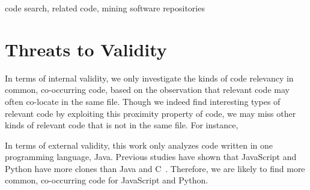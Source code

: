 \documentclass[conference]{IEEEtran}
\begin{document}
\begin{abstract}

\end{abstract}

\begin{IEEEkeywords}
code search, related code, mining software repositories
\end{IEEEkeywords}











\section{Threats to Validity}
In terms of internal validity, we only investigate the kinds of code relevancy in common, co-occurring code, based on the observation that relevant code may often co-locate in the same file. Though we indeed find interesting types of relevant code by exploiting this proximity property of code, we may miss other kinds of relevant code that is not in the same file. For instance,  

In terms of external validity, this work only analyzes code written in one programming language, Java. Previous studies have shown that JavaScript and Python have more clones than Java and C~\cite{lopes2017dejavu, yang2017stack}. Therefore, we are likely to find more common, co-occurring code for JavaScript and Python.
\end{document}
